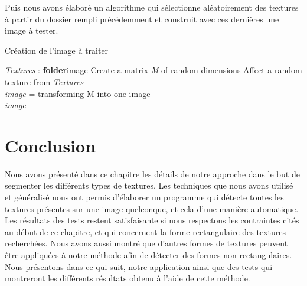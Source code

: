 Puis nous avons élaboré un algorithme qui sélectionne aléatoirement des textures à partir du dossier rempli précédemment et construit avec ces dernières une image à tester.

\label{algo creation}
\begin{algorithme}[H]
\caption{Création de l'image à traiter}
{\textit{Textures} : \textbf{folder}}{image}
{
Create a matrix \textit{M} of random dimensions
{
	Affect a random texture from \textit{Textures}
}
\\
\textit{image} = transforming M into one image
\\
\Return \textit{image}
}
\end{algorithme}

\section{Conclusion}
\indent Nous avons présenté dans ce chapitre les détails de notre approche dans le but de segmenter les différents types de textures. Les techniques que nous avons utilisé et généralisé nous ont permis d'élaborer un programme qui détecte toutes les textures présentes sur une image quelconque, et cela d'une manière automatique.\\
\indent Les résultats des tests restent satisfaisante si nous respectons les contraintes cités au début de ce chapitre, et qui concernent la forme rectangulaire des textures recherchées. Nous avons aussi montré que d'autres formes de textures peuvent être appliquées à notre méthode afin de détecter des formes non rectangulaires.\\
\indent Nous présentons dans ce qui suit, notre application ainsi que des tests qui montreront les différents résultats obtenu à l'aide de cette méthode.
